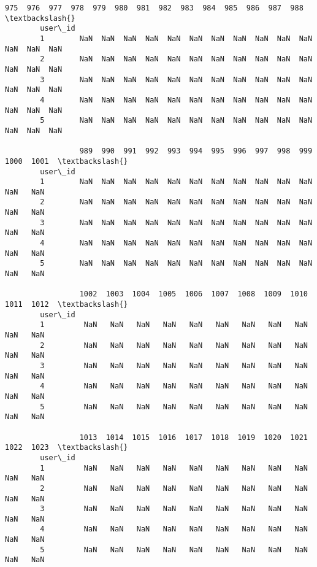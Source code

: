 \documentclass[11pt]{article}
\begin{document}
\begin{Verbatim}[commandchars=\\\{\}]
                 975  976  977  978  979  980  981  982  983  984  985  986  987  988  \textbackslash{}
        user\_id                                                                         
        1        NaN  NaN  NaN  NaN  NaN  NaN  NaN  NaN  NaN  NaN  NaN  NaN  NaN  NaN   
        2        NaN  NaN  NaN  NaN  NaN  NaN  NaN  NaN  NaN  NaN  NaN  NaN  NaN  NaN   
        3        NaN  NaN  NaN  NaN  NaN  NaN  NaN  NaN  NaN  NaN  NaN  NaN  NaN  NaN   
        4        NaN  NaN  NaN  NaN  NaN  NaN  NaN  NaN  NaN  NaN  NaN  NaN  NaN  NaN   
        5        NaN  NaN  NaN  NaN  NaN  NaN  NaN  NaN  NaN  NaN  NaN  NaN  NaN  NaN   
        
                 989  990  991  992  993  994  995  996  997  998  999  1000  1001  \textbackslash{}
        user\_id                                                                      
        1        NaN  NaN  NaN  NaN  NaN  NaN  NaN  NaN  NaN  NaN  NaN   NaN   NaN   
        2        NaN  NaN  NaN  NaN  NaN  NaN  NaN  NaN  NaN  NaN  NaN   NaN   NaN   
        3        NaN  NaN  NaN  NaN  NaN  NaN  NaN  NaN  NaN  NaN  NaN   NaN   NaN   
        4        NaN  NaN  NaN  NaN  NaN  NaN  NaN  NaN  NaN  NaN  NaN   NaN   NaN   
        5        NaN  NaN  NaN  NaN  NaN  NaN  NaN  NaN  NaN  NaN  NaN   NaN   NaN   
        
                 1002  1003  1004  1005  1006  1007  1008  1009  1010  1011  1012  \textbackslash{}
        user\_id                                                                     
        1         NaN   NaN   NaN   NaN   NaN   NaN   NaN   NaN   NaN   NaN   NaN   
        2         NaN   NaN   NaN   NaN   NaN   NaN   NaN   NaN   NaN   NaN   NaN   
        3         NaN   NaN   NaN   NaN   NaN   NaN   NaN   NaN   NaN   NaN   NaN   
        4         NaN   NaN   NaN   NaN   NaN   NaN   NaN   NaN   NaN   NaN   NaN   
        5         NaN   NaN   NaN   NaN   NaN   NaN   NaN   NaN   NaN   NaN   NaN   
        
                 1013  1014  1015  1016  1017  1018  1019  1020  1021  1022  1023  \textbackslash{}
        user\_id                                                                     
        1         NaN   NaN   NaN   NaN   NaN   NaN   NaN   NaN   NaN   NaN   NaN   
        2         NaN   NaN   NaN   NaN   NaN   NaN   NaN   NaN   NaN   NaN   NaN   
        3         NaN   NaN   NaN   NaN   NaN   NaN   NaN   NaN   NaN   NaN   NaN   
        4         NaN   NaN   NaN   NaN   NaN   NaN   NaN   NaN   NaN   NaN   NaN   
        5         NaN   NaN   NaN   NaN   NaN   NaN   NaN   NaN   NaN   NaN   NaN   
        

\end{Verbatim}
\end{document}
